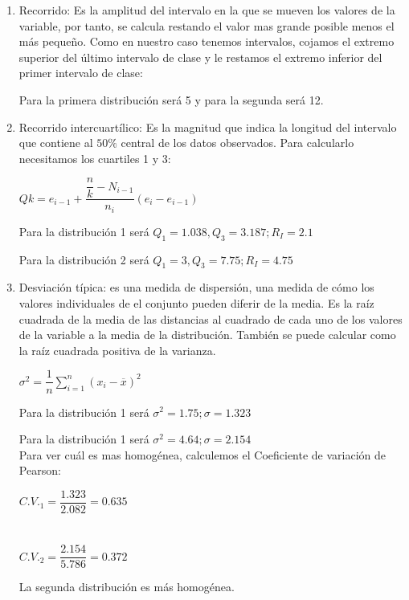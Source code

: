\begin{enumerate}
	\item Recorrido: Es la amplitud del intervalo en la que se mueven los valores de la variable, por tanto, se calcula restando el valor mas grande posible menos el más pequeño. Como en nuestro caso tenemos intervalos, cojamos el extremo superior del último intervalo de clase y le restamos el extremo inferior del primer intervalo de clase:
	
	Para la primera distribución será 5 y para la segunda será 12.
	\item Recorrido intercuartílico: Es la magnitud que indica la longitud del intervalo que contiene al $50\%$ central de los datos observados. Para calcularlo necesitamos los cuartiles 1 y 3:
	
	\begin{center}
		$Qk = e_{i-1} + \dfrac{\dfrac{n}{k} - N_{i-1}}{n_i}(e_i-e_{i-1})$
	\end{center}
	
	Para la distribución 1 será $Q_1 = 1.038, Q_3 = 3.187; R_I = 2.1$
	
	Para la distribución 2 será $Q_1 = 3, Q_3 = 7.75; R_I = 4.75$\\
	
	\item Desviación típica: es una medida de dispersión, una medida de cómo los valores individuales de el conjunto pueden diferir de la media. Es la raíz cuadrada de la media de las distancias al cuadrado de cada uno de los valores de la variable a la media de la distribución. También se puede calcular como la raíz cuadrada positiva de la varianza.
	\begin{center}
		$\sigma^2 = \dfrac{1}{n} \sum_{i=1}^{n}(x_i-\overline{x})^2$
	\end{center}
	
	Para la distribución 1 será $\sigma^2 = 1.75; \sigma = 1.323$
	
	Para la distribución 1 será $\sigma^2 = 4.64; \sigma = 2.154$\\
	
	
	Para ver cuál es mas homogénea, calculemos el Coeficiente de variación de Pearson:
	
	$C.V._1 = \dfrac{1.323}{2.082}= 0.635$ \\
	\\
	\\
	$C.V._2 = \dfrac{2.154}{5.786}= 0.372$
	
	La segunda distribución es más homogénea.
	
\end{enumerate}
